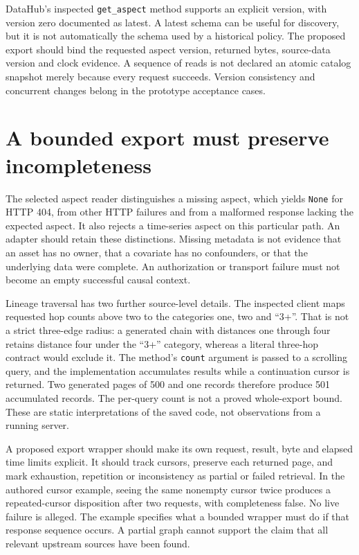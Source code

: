 DataHub's inspected \texttt{get\_aspect} method supports an explicit version,
with version zero documented as latest. A latest schema can be useful for
discovery, but it is not automatically the schema used by a historical policy.
The proposed export should bind the requested aspect version, returned bytes,
source-data version and clock evidence. A sequence of reads is not declared
an atomic catalog snapshot merely because every request succeeds. Version
consistency and concurrent changes belong in the prototype acceptance cases.
\citep{exec16_dh_primary,exec16_dh_contract}

\section{A bounded export must preserve incompleteness}

The selected aspect reader distinguishes a missing aspect, which yields
\texttt{None} for HTTP 404, from other HTTP failures and from a malformed
response lacking the expected aspect. It also rejects a time-series aspect
on this particular path. An adapter should retain these distinctions. Missing
metadata is not evidence that an asset has no owner, that a covariate has no
confounders, or that the underlying data were complete. An authorization or
transport failure must not become an empty successful causal context.
\citep{exec16_dh_primary}

Lineage traversal has two further source-level details. The inspected client
maps requested hop counts above two to the categories one, two and ``3+''.
That is not a strict three-edge radius: a generated chain with distances
one through four retains distance four under the ``3+'' category, whereas a
literal three-hop contract would exclude it. The method's \texttt{count}
argument is passed to a scrolling query, and the implementation accumulates
results while a continuation cursor is returned. Two generated pages of 500
and one records therefore produce 501 accumulated records. The per-query
count is not a proved whole-export bound. These are static interpretations
of the saved code, not observations from a running server.
\citep{exec16_dh_primary,exec16_dh_exact}

A proposed export wrapper should make its own request, result, byte and elapsed
time limits explicit. It should track cursors, preserve each returned page,
and mark exhaustion, repetition or inconsistency as partial or failed retrieval.
In the authored cursor example, seeing the same nonempty cursor twice produces
a repeated-cursor disposition after two requests, with completeness false.
No live failure is alleged. The example specifies what a bounded wrapper must
do if that response sequence occurs. A partial graph cannot support the
claim that all relevant upstream sources have been found.
\citep{exec16_dh_exact,exec16_dh_contract}

